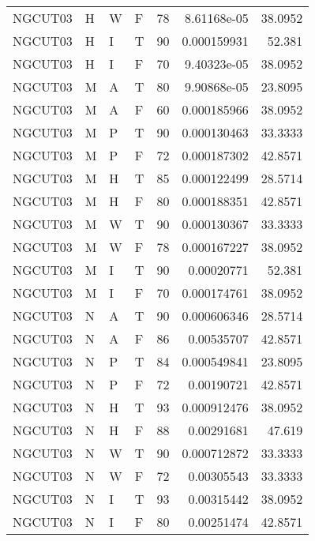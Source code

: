 \begin{table}[htb!]
{\begin{tabular}{llllrrr}
            NGCUT03  & H     & W     & F          & 78         & 8.61168e-05 & 38.0952  \\
            NGCUT03  & H     & I     & T          & 90         & 0.000159931 & 52.381   \\
            NGCUT03  & H     & I     & F          & 70         & 9.40323e-05 & 38.0952  \\
            NGCUT03  & M     & A     & T          & 80         & 9.90868e-05 & 23.8095  \\
            NGCUT03  & M     & A     & F          & 60         & 0.000185966 & 38.0952  \\
            NGCUT03  & M     & P     & T          & 90         & 0.000130463 & 33.3333  \\
            NGCUT03  & M     & P     & F          & 72         & 0.000187302 & 42.8571  \\
            NGCUT03  & M     & H     & T          & 85         & 0.000122499 & 28.5714  \\
            NGCUT03  & M     & H     & F          & 80         & 0.000188351 & 42.8571  \\
            NGCUT03  & M     & W     & T          & 90         & 0.000130367 & 33.3333  \\
            NGCUT03  & M     & W     & F          & 78         & 0.000167227 & 38.0952  \\
            NGCUT03  & M     & I     & T          & 90         & 0.00020771  & 52.381   \\
            NGCUT03  & M     & I     & F          & 70         & 0.000174761 & 38.0952  \\
            NGCUT03  & N     & A     & T          & 90         & 0.000606346 & 28.5714  \\
            NGCUT03  & N     & A     & F          & 86         & 0.00535707  & 42.8571  \\
            NGCUT03  & N     & P     & T          & 84         & 0.000549841 & 23.8095  \\
            NGCUT03  & N     & P     & F          & 72         & 0.00190721  & 42.8571  \\
            NGCUT03  & N     & H     & T          & 93         & 0.000912476 & 38.0952  \\
            NGCUT03  & N     & H     & F          & 88         & 0.00291681  & 47.619   \\
            NGCUT03  & N     & W     & T          & 90         & 0.000712872 & 33.3333  \\
            NGCUT03  & N     & W     & F          & 72         & 0.00305543  & 33.3333  \\
            NGCUT03  & N     & I     & T          & 93         & 0.00315442  & 38.0952  \\
            NGCUT03  & N     & I     & F          & 80         & 0.00251474  & 42.8571  \\
            \hline
        \end{tabular}
    }{
    }
\end{table} 
